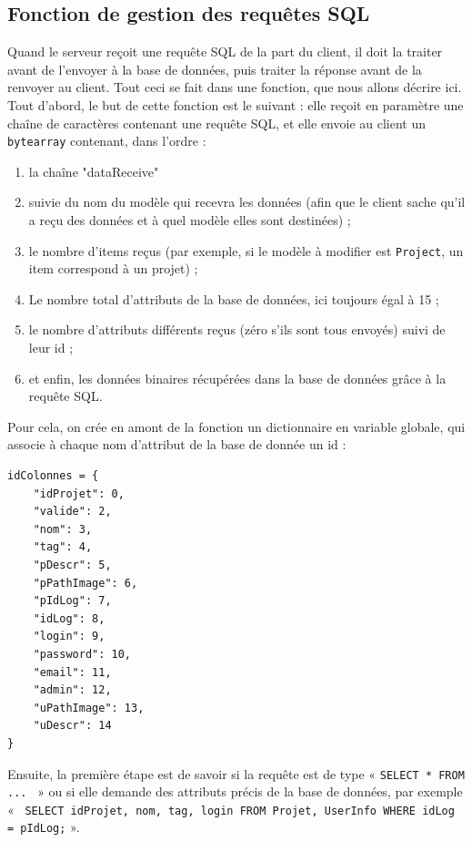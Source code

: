 \documentclass{report}
\begin{document}
\subsection{Fonction de gestion des requêtes SQL}
Quand le serveur reçoit une requête SQL de la part du client, il doit la traiter avant de l'envoyer à la base de données, puis traiter la réponse avant de la renvoyer au client. Tout ceci se fait dans une fonction, que nous allons décrire ici. \\
Tout d'abord, le but de cette fonction est le suivant : elle reçoit en paramètre une chaîne de caractères contenant une requête SQL, et elle envoie au client un \verb!bytearray! contenant, dans l'ordre :
\begin{enumerate}
    \item la chaîne "dataReceive"
    \item suivie du nom du modèle qui recevra les données (afin que le client sache qu'il a reçu des données et à quel modèle elles sont destinées) ;
    \item le nombre d'items reçus (par exemple, si le modèle à modifier est \verb!Project!, un item correspond à un projet) ;
    \item Le nombre total d'attributs de la base de données, ici toujours égal à 15 ;
    \item le nombre d'attributs différents reçus (zéro s'ils sont tous envoyés) suivi de leur id ;
    \item et enfin, les données binaires récupérées dans la base de données grâce à la requête SQL.
\end{enumerate}
Pour cela, on crée en amont de la fonction un dictionnaire en variable globale, qui associe à chaque nom d'attribut de la base de donnée un id :
\begin{lstlisting}[style=py, caption=serveur.py : dictionnaire idColonne, label=idc]
idColonnes = {
    "idProjet": 0,
    "valide": 2,
    "nom": 3,
    "tag": 4,
    "pDescr": 5,
    "pPathImage": 6,
    "pIdLog": 7,
    "idLog": 8,
    "login": 9,
    "password": 10,
    "email": 11,
    "admin": 12,
    "uPathImage": 13,
    "uDescr": 14
}
\end{lstlisting}

Ensuite, la première étape est de savoir si la requête est de type « \verb!SELECT * FROM ...!~ » ou si elle demande des attributs précis de la base de données, par exemple «~ \verb!SELECT idProjet, nom, tag, login FROM Projet, UserInfo WHERE idLog = pIdLog;! ». \\
\end{document}
